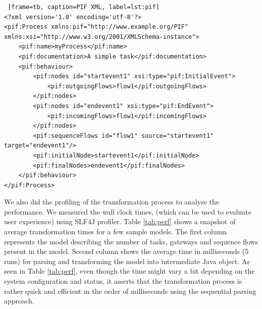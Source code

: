 \documentclass{article}
\begin{document}
\begin{lstlisting} [frame=tb, caption=PIF XML, label=lst:pif]
<?xml version='1.0' encoding='utf-8'?>
<pif:Process xmlns:pif="http://www.example.org/PIF" xmlns:xsi="http://www.w3.org/2001/XMLSchema-instance">
	<pif:name>myProcess</pif:name>
	<pif:documentation>A simple task</pif:documentation>
	<pif:behaviour>
		<pif:nodes id="startevent1" xsi:type="pif:InitialEvent">
			<pif:outgoingFlows>flow1</pif:outgoingFlows>
		</pif:nodes>
		<pif:nodes id="endevent1" xsi:type="pif:EndEvent">
			<pif:incomingFlows>flow1</pif:incomingFlows>
		</pif:nodes>
		<pif:sequenceFlows id="flow1" source="startevent1" target="endevent1"/>
		<pif:initialNode>startevent1</pif:initialNode>
		<pif:finalNodes>endevent1</pif:finalNodes>
	</pif:behaviour>
</pif:Process>
\end{lstlisting}

We also did the profiling of the transformation process to analyse the performance. We measured the wall clock times, (which can be used to evaluate user experience) using SLF4J profiler. Table \ref{tab:perf} shows a snapshot of average transformation times for a few sample models. The first column represents the model describing the number of tasks, gateways and sequence flows present in the model. Second column shows the average time in milliseconds (5 runs) for parsing and transforming the model into intermediate Java object. As seen in Table \ref{tab:perf}, even though the time might vary a bit depending on the system configuration and status, it asserts that the transformation process is rather quick and efficient in the order of milliseconds using the sequential parsing approach.
\end{document}
